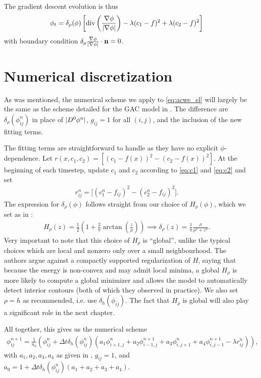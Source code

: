 The gradient descent evolution is thus 
\begin{align}
\phi_t 
= \delta_\rho(\phi) \left[ 
\operatorname{div}\left(\frac{\nabla \phi}{\lvert\nabla \phi\rvert} \right) - \lambda (c_1 - f)^2 + \lambda (c_2 - f)^2 
\right]
\label{eq:acwe_el}
\end{align}
with boundary condition $\delta_\rho 
\frac{\nabla \phi}{\lvert\nabla \phi\rvert} \cdot \mathbf{n} = 0$.


\section{Numerical discretization}
\label{sec:3.2}
As was mentioned, the numerical scheme we apply to \eqref{eq:acwe_el} will largely be the same as the scheme detailed for the GAC model in . The difference are $\delta_\rho(\phi^n_{ij})$ in place of $\lvert D^0 \phi^n\rvert$, $g_{ij} = 1$ for all $(i,j)$, and the inclusion of the new fitting terms.

The fitting terms are straightforward to handle as they have no explicit $\phi$-dependence. Let $r(x, c_1, c_2) = [(c_1 - f(x))^2 - (c_2 - f(x))^2 ]$. At the beginning of each timestep, update $c_1$ and $c_2$ according to \eqref{eq:c1} and \eqref{eq:c2} and set
\begin{align*}
r_{ij}^n = \big[ (c_1^n - f_{ij})^2 - (c_2^n - f_{ij})^2 \big].
\end{align*}
The expression for $\delta_\rho(\phi)$ follows straight from our choice of $H_\rho(\phi)$, which we set as in \cite{chan2001active}:
\begin{align*}
H_\rho(z)
 = \frac{1}{2} 
\left(1 + \frac{2}{\pi}\arctan
\left(\frac{z}{\rho} 
\right) \right)
\implies 
\delta_\rho(z)  
=  \frac{1}{\pi}\frac{\rho}{\rho^2  + z^2}.
\end{align*}
Very important to note that this choice of $H_\rho$ is ``global'', unlike the typical choices which are local and nonzero only over a small neighbourhood. The authors argue against a compactly supported regularization of $H$, saying that because the energy is non-convex and may admit local minima, a global $H_\rho$ is more likely to compute a global minimizer and allows the model to automatically detect interior contours (both of which they observed in practice). We also set $\rho = h$ as recommended, i.e. use $\delta_h(\phi_{ij})$. The fact that $H_\rho$ is global will also play a significant role in the next chapter.

All together, this gives us the numerical scheme
\begin{align*}
\phi^{n+1}_{ij} 
= \frac{1}{a_0} 
\left( \phi^n_{ij} + \Delta t \delta_h(\phi_{ij}^n)
\left( a_1 \phi^n_{i+1,j} + a_2 \phi^{n+1}_{i-1,j} + a_3 \phi^{n}_{i,j+1} + a_4 \phi^{n+1}_{i,j-1} 
- \lambda r_{ij}^n
\right)
\right),
\end{align*}
with $a_1, a_2, a_3, a_4$  as given in , $g_{ij} = 1$, and $a_0 = 1 + \Delta t \delta_h(\phi_{ij}^n)(a_1 + a_2 + a_3 + a_4)$.

